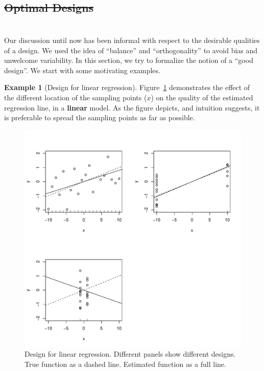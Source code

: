 \documentclass[12pt,a4paper]{report}
\theoremstyle{plain}
\theoremstyle{definition}
\newtheorem{example}{Example}
\providecommand{\DIFaddtex}[1]{{\protect\color{blue}\uwave{#1}}} %
\providecommand{\DIFdeltex}[1]{{\protect\color{red}\sout{#1}}}                      %
\providecommand{\DIFaddbegin}{} %
\providecommand{\DIFaddend}{} %
\providecommand{\DIFdelbegin}{} %
\providecommand{\DIFdelend}{} %
\providecommand{\DIFadd}[1]{\texorpdfstring{\DIFaddtex{#1}}{#1}} %
\providecommand{\DIFdel}[1]{\texorpdfstring{\DIFdeltex{#1}}{}} %
\begin{document}
\DIFdelbegin \subsection{\DIFdel{Optimal Designs}}
\addtocounter{subsection}{-1}%
\DIFdelend \DIFaddbegin \section{\DIFadd{Optimal Designs}}
\DIFaddend 


Our discussion until now has been informal with respect to the desirable qualities of a design. 
We used the idea of ``balance'' and ``orthogonality'' to avoid bias and unwelcome variability.
In this section, we try to formalize the notion of a ``good design''.
We start with some motivating examples.

\begin{example}[Design for linear regression]
\label{eg:design_linear}
Figure~\ref{fig:design_linear} demonstrates the effect of the different location of the sampling points ($x$) on the quality of the estimated regression line, in a \textbf{linear} model.
As the figure depicts, and intuition suggests, it is preferable to spread the sampling points as far as possible.
\begin{figure}[ht]
\centering
\includegraphics[height=0.3\textheight]{art/linear}
\caption[Design for Linear Models]{Design for linear regression. Different panels show different designs. True function as a dashed line. Estimated function as a full line.}
\label{fig:design_linear}
\end{figure}
\end{example}
\end{document}

